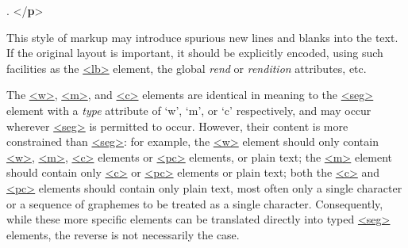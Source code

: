 \begin{shaded}
\hspace*{1em}\hspace*{1em}\hspace*{1em}\hspace*{1em}\mbox{}\newline 
\hspace*{1em}\hspace*{1em}\hspace*{1em}\mbox{}\newline 
\hspace*{1em}\hspace*{1em}\mbox{}\newline 
\hspace*{1em}\mbox{}\newline 
{}.\mbox{}\newline 
{</\textbf{p}>}\end{shaded}\egroup\par \par
This style of markup may introduce spurious new lines and blanks into the text. If the original layout is important, it should be explicitly encoded, using such facilities as the \hyperref[TEI.lb]{<lb>} element, the global {\itshape rend} or {\itshape rendition} attributes, etc.\par
The \hyperref[TEI.w]{<w>}, \hyperref[TEI.m]{<m>}, and \hyperref[TEI.c]{<c>} elements are identical in meaning to the \hyperref[TEI.seg]{<seg>} element with a {\itshape type} attribute of ‘w’, ‘m’, or ‘c’ respectively, and may occur wherever \hyperref[TEI.seg]{<seg>} is permitted to occur. However, their content is more constrained than \hyperref[TEI.seg]{<seg>}: for example, the \hyperref[TEI.w]{<w>} element should only contain \hyperref[TEI.w]{<w>}, \hyperref[TEI.m]{<m>}, \hyperref[TEI.c]{<c>} elements or \hyperref[TEI.pc]{<pc>} elements, or plain text; the \hyperref[TEI.m]{<m>} element should contain only \hyperref[TEI.c]{<c>} or \hyperref[TEI.pc]{<pc>} elements or plain text; both the \hyperref[TEI.c]{<c>} and \hyperref[TEI.pc]{<pc>} elements should contain only plain text, most often only a single character or a sequence of graphemes to be treated as a single character. Consequently, while these more specific elements can be translated directly into typed \hyperref[TEI.seg]{<seg>} elements, the reverse is not necessarily the case.\par
